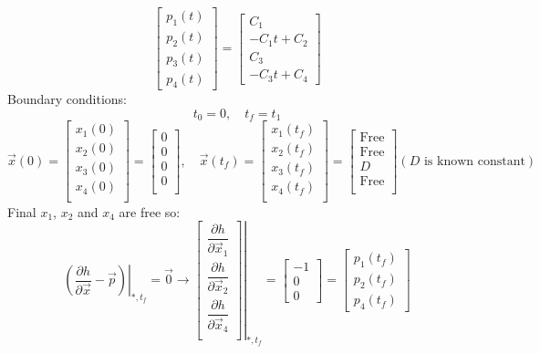 \begin{equation}\label{SolvepQ2_d}
	\begin{bmatrix}
		p_1(t)\\
		p_2(t)\\
		p_3(t)\\
		p_4(t)
	\end{bmatrix} = \begin{bmatrix}
		C_1\\
		-C_1t+C_2\\
		C_3\\
		-C_3t+C_4
	\end{bmatrix} 
\end{equation}
Boundary conditions:
$$t_0 = 0,\quad t_f = t_1$$
$$\vec{x}(0) = \begin{bmatrix}
	x_1(0) \\
	x_2(0) \\
	x_3(0) \\
	x_4(0) \\
\end{bmatrix}= \begin{bmatrix}
	0 \\
	0 \\
	0 \\
	0 \\
\end{bmatrix}, \quad
\vec{x}(t_f) = \begin{bmatrix}
	x_1(t_f) \\
	x_2(t_f) \\
	x_3(t_f) \\
	x_4(t_f) \\
\end{bmatrix}= \begin{bmatrix}
	\text{Free} \\
	\text{Free} \\
	D \\
	\text{Free} \\
\end{bmatrix}
(D\text{ is known constant})$$
Final $x_1$, $x_2$ and $x_4$ are free so:
\begin{equation}\label{Solvep_1Q2_d}
	\left.(\dfrac{\partial h}{\partial \vec x} - \vec p) \right \vert_{*, t_f} = \vec 0 \to \left
	.\begin{bmatrix}
		\dfrac{\partial h}{\partial \vec x_1} \\[10pt]
		\dfrac{\partial h}{\partial \vec x_2} \\[10pt]
		\dfrac{\partial h}{\partial \vec x_4} \\
	\end{bmatrix}\right \vert_{*, t_f} = \begin{bmatrix}
	-1 \\
	0 \\
	0
\end{bmatrix} = \begin{bmatrix}
p_1(t_f) \\
p_2(t_f) \\
p_4(t_f)
\end{bmatrix} 
\end{equation}
